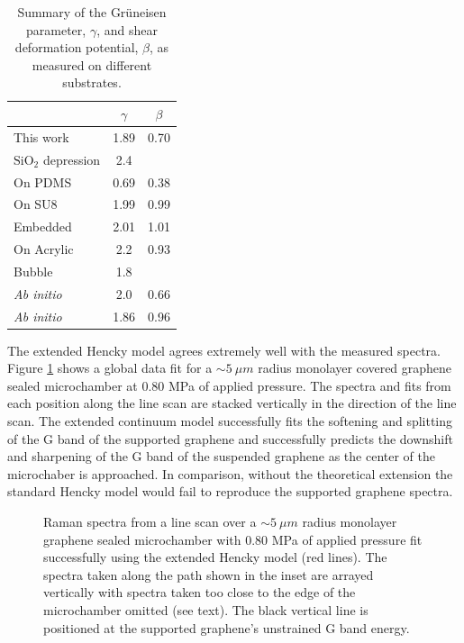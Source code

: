 \begin{table}
	\begin{center}
	\begin{tabular}{l c  c }
		\hline
		\hline
		 & $\gamma$ & $\beta$ \\
		 \hline
		 This work & 1.89 & 0.70 \\
		 $\mathrm{SiO_2}$ depression \cite{Metzger2010} & 2.4 & \\
		 On PDMS \cite{Huang2009} & 0.69 & 0.38 \\
		 On SU8 \cite{Mohiuddin2009} & 1.99 & 0.99\\
		 Embedded \cite{Frank2010} & 2.01 & 1.01 \\
		 On Acrylic \cite{Yoon2011} & 2.2 & 0.93\\
		 Bubble \cite{Zabel2012} & 1.8 \\
		\textit{Ab initio} \cite{Thomsen2002} & 2.0 & 0.66 \\
		\textit{Ab initio} \cite{Cheng2011} & 1.86 & 0.96\\
		 \hline
		 \hline
	\end{tabular}
	\end{center}
	\caption[Summary of the Gr\"{u}neisen parameter and shear deformation potential as measured on different substrates]{\label{tab:fri:gb} Summary of the Gr\"{u}neisen parameter, $\gamma$, and shear deformation potential, $\beta$, as measured on different substrates.}
\end{table}

The extended Hencky model agrees extremely well with the measured spectra.
Figure \ref{fig:fri:fitlinescan} shows a global data fit for a $\sim 5 \ \mu m$ radius monolayer covered graphene sealed microchamber at 0.80 MPa of applied pressure.
The spectra and fits from each position along the line scan are stacked vertically in the direction of the line scan.
The extended continuum model successfully fits the softening and splitting of the G band of the supported graphene and successfully predicts the downshift and sharpening of the G band of the suspended graphene as the center of the microchaber is approached.
In comparison, without the theoretical extension the standard Hencky model would fail to reproduce the supported graphene spectra.

\begin{figure}
	\begin{center}
	
	\end{center}
	\caption[Fit line scan spectra]{\label{fig:fri:fitlinescan} 
	Raman spectra from a line scan over a $\sim 5 \ \mu m$ radius monolayer graphene sealed microchamber with 0.80 MPa of applied pressure fit successfully using the extended Hencky model (red lines).
	The spectra taken along the path shown in the inset are arrayed vertically with spectra taken too close to the edge of the microchamber omitted (see text).
	The black vertical line is positioned at the supported graphene's unstrained G band energy.}
\end{figure}

